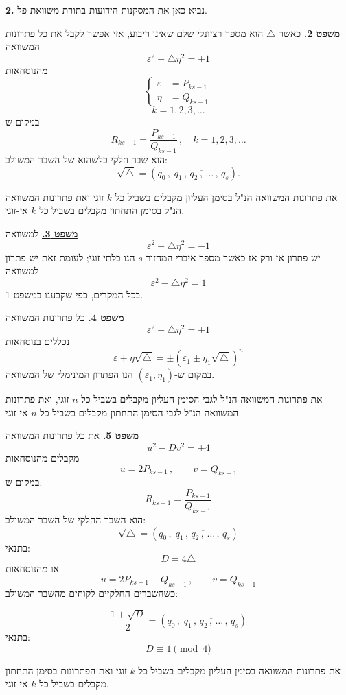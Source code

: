 \noindent\textbf{2.} נביא כאן את המסקנות הידועות בתורת משוואת פל.

\bigskip
\noindent\textbf{\underline{משפט 2.}}
כאשר $\triangle$ הוא מספר רציונלי שלם שאינו ריבוע, אזי אפשר לקבל את כל פתרונות המשוואה
\[ \varepsilon^2 - \triangle \eta^2 = \pm 1 \tag{1} \]
מהנוסחאות
\[
\left\{
\begin{aligned}
\varepsilon &= P_{ks-1} \\
\eta &= Q_{ks-1}
\end{aligned}
\right. \tag{2}
\]
\[ k = 1, 2, 3, \ldots \]
במקום ש
\[ R_{ks-1} = \frac{P_{ks-1}}{Q_{ks-1}} \, , \quad k = 1, 2, 3, \ldots \]
הוא שבר חלקי כלשהוא של השבר המשולב:
\[ \sqrt{\triangle} = (q_0 \, , \; \overline{q_1 \, , \, q_2 \, , \, \ldots \, , \, q_s}) . \]

את פתרונות המשוואה הנ"ל בסימן העליון מקבלים בשביל כל $k$ זוגי
ואת פתרונות המשוואה הנ"ל בסימן התחתון מקבלים בשביל כל $k$ אי-זוגי.

\bigskip
\noindent\textbf{\underline{משפט 3.}}
למשוואה
\[ \varepsilon^2 - \triangle \eta^2 = -1 \]
יש פתרון אז ורק אז כאשר מספר איברי המחזור $s$ הנו בלתי-זוגי; לעומת זאת יש פתרון למשוואה
\[ \varepsilon^2 - \triangle \eta^2 = 1 \]
בכל המקרים, כפי שקבענו במשפט 1.

\noindent\textbf{\underline{משפט 4.}}
כל פתרונות המשוואה
\[ \varepsilon^2 - \triangle \eta^2 = \pm 1 \]
נכללים בנוסחאות
\[ \varepsilon + \eta\sqrt{\triangle} = \pm(\varepsilon_1 \pm \eta_1\sqrt{\triangle})^n \]
במקום ש-$(\varepsilon_1, \eta_1)$ הנו הפתרון המינימלי של המשוואה.

את פתרונות המשוואה הנ"ל לגבי הסימן העליון מקבלים בשביל כל $n$ זוגי, ואת פתרונות המשוואה הנ"ל לגבי הסימן התחתון מקבלים בשביל כל $n$ אי-זוגי.

\bigskip
\noindent\textbf{\underline{משפט 5.}}
את כל פתרונות המשוואה
\[ u^2 - Dv^2 = \pm 4 \]
מקבלים מהנוסחאות
\[ u = 2P_{ks-1} \, , \qquad v = Q_{ks-1} \]
במקום ש:
\[ R_{ks-1} = \frac{P_{ks-1}}{Q_{ks-1}} \]
הוא השבר החלקי של השבר המשולב:
\[ \sqrt{\triangle} = (q_0 \, , \; \overline{q_1 \, , \, q_2 \, , \, \ldots \, , \, q_s}) \]
בתנאי:
\[ D = 4\triangle \]
או מהנוסחאות
\[ u = 2P_{ks-1} - Q_{ks-1} \, , \qquad v = Q_{ks-1} \]
כשהשברים החלקיים לקוחים מהשבר המשולב:

\[ \frac{1 + \sqrt{D}}{2} = (q_0 \, , \; \overline{q_1 \, , \, q_2 \, , \, \ldots \, , \, q_s}) \]
בתנאי:
\[ D \equiv 1 \pmod{4} \]

את פתרונות המשוואה בסימן העליון מקבלים בשביל כל $k$ זוגי ואת הפתרונות בסימן התחתון מקבלים בשביל כל $k$ אי-זוגי.

